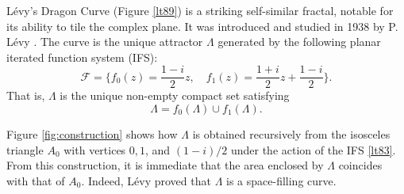 \documentclass[12pt, a4paper]{amsart}
\numberwithin{equation}{section}
\numberwithin{theorem}{section}
\begin{document}
L\'evy’s Dragon Curve (Figure \ref{lt89}) is a striking self-similar fractal, notable for its ability to tile the complex plane. It was introduced and studied in 1938 by P. L\'evy \cite{Levy-1938}. The curve is the unique attractor $\Lambda$ generated by the following planar iterated function system (IFS):
\begin{equation}\label{lt83}
\mathcal{F}=
  \bigg\{
    f_0(z)=\frac{1-i}{2}z,\quad 
    f_1(z)=\frac{1+i}{2}z+\frac{1-i}{2}  
  \bigg\}.
\end{equation}
That is, $\Lambda$ is the unique non-empty compact set satisfying 
\begin{equation}\label{lt84}
  \Lambda = f_0(\Lambda)\cup f_1(\Lambda).
\end{equation} 

Figure \ref{fig:construction} shows how $\Lambda$ is obtained recursively from the isosceles triangle $A_0$ with vertices $0,1$, and $(1-i)/2$ under the action of the IFS \eqref{lt83}. From this construction, it is immediate that the area enclosed by $\Lambda$ coincides with that of $A_0$. Indeed, L\'evy proved that $\Lambda$ is a space-filling curve. 
\end{document}

